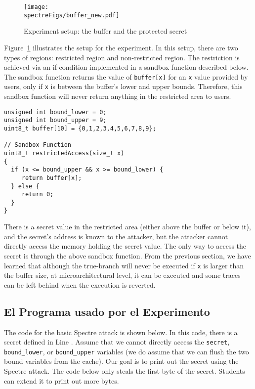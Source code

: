 \begin{figure}[htb]
\centering
\texttt{[image: \\spectreFigs/buffer\_new.pdf]}
\caption{Experiment setup: the buffer and the protected secret}
\label{spectre:fig:buffer}
\end{figure}

Figure~\ref{spectre:fig:buffer} illustrates the setup for the experiment.
In this setup, there are two types of regions: restricted region and non-restricted region.
The restriction is achieved via an if-condition implemented in a sandbox function
described below. The sandbox function returns the value of \texttt{buffer[x]} for an \texttt{x}
value provided by users, only if \texttt{x} is between the buffer's
lower and upper bounds.
Therefore, this sandbox function
will never return anything in the restricted area to users.


\begin{lstlisting}
unsigned int bound_lower = 0;
unsigned int bound_upper = 9;
uint8_t buffer[10] = {0,1,2,3,4,5,6,7,8,9};

// Sandbox Function
uint8_t restrictedAccess(size_t x)
{
  if (x <= bound_upper && x >= bound_lower) {
     return buffer[x];
  } else {
     return 0;
  }
}
\end{lstlisting}

There is a secret value in the restricted area (either above the buffer
or below it), and the secret's address is known to the attacker, but
the attacker cannot directly access the memory holding the secret value.
The only way to access the
secret is through the above sandbox function. From the previous section, we have learned that
although the true-branch will never be executed if \texttt{x} is larger than the buffer size,
at microarchitectural level, it can be executed and some traces can be left behind
when the execution is reverted.


\subsection{El Programa usado por el Experimento}


The code for the basic Spectre attack is shown below. In this code, there is a
secret defined in Line . Assume that we cannot directly
access the \texttt{secret}, \texttt{bound\_lower}, or 
\texttt{bound\_upper} variables (we do assume that we
can flush the two bound variables from the cache). 
Our goal is to print out the secret
using the Spectre attack. The code below only steals the first byte of the secret. Students can
extend it to print out more bytes. 



